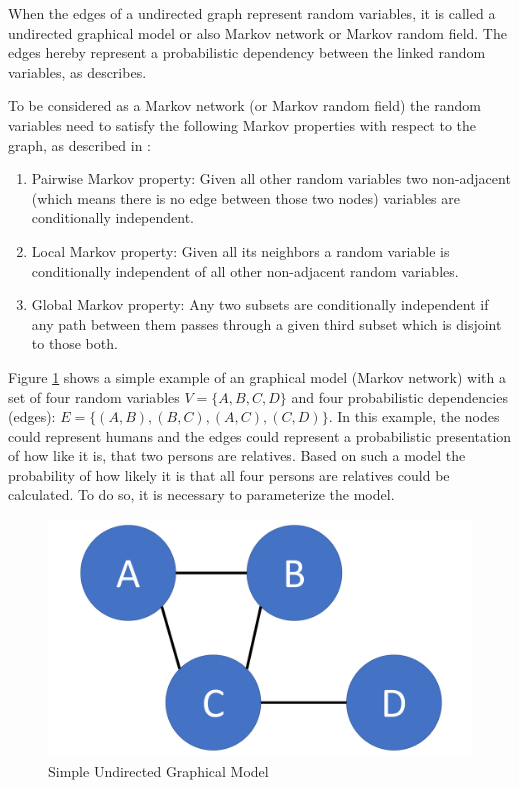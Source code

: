 When the edges of a undirected graph represent random variables, it is called a undirected graphical model or also Markov network or Markov random field. The edges hereby represent a probabilistic dependency between the linked random variables, as \cite{kindermann1980markov} describes.

To be considered as a Markov network (or Markov random field) the random variables need to satisfy the following Markov properties with respect to the graph, as described in \cite{markov1957theory}:

\begin{enumerate}
\item Pairwise Markov property: Given all other random variables two non-adjacent (which means there is no edge between those two nodes) variables are conditionally independent.
\item Local Markov property: Given all its neighbors a random variable is conditionally independent of all other non-adjacent random variables.
\item Global Markov property: Any two subsets are conditionally independent if any path between them passes through a given third subset which is disjoint to those both.  
\end{enumerate}


Figure \ref{fig:basic} shows a simple example of an graphical model (Markov network) with a set of four random variables $V=\{A,B,C,D\}$ and four probabilistic dependencies (edges): $E=\{(A,B),(B,C),(A,C),(C,D)\}$. In this example, the nodes could represent humans and the edges could represent a probabilistic presentation of how like it is, that two persons are relatives. Based on such a model the probability of how likely it is that all four persons are relatives could be calculated. To do so, it is necessary to parameterize the model.

\begin{figure}[htpb]
  \centering
  	\includegraphics[scale=0.3]{img/basic.pdf} 
  \caption{Simple Undirected Graphical Model}
  \label{fig:basic}
\end{figure}

